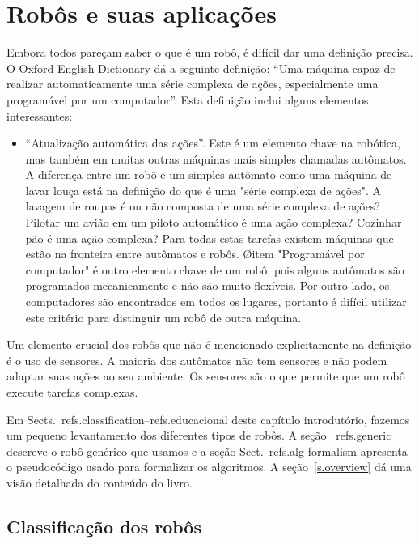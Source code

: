 
\chapter{Robôs e suas aplicações}\label{ch.basic}

Embora todos pareçam saber o que é um robô, é difícil dar uma definição precisa. O Oxford English Dictionary dá a seguinte definição: ``Uma máquina capaz de realizar automaticamente uma série complexa de ações, especialmente uma programável por um computador''. Esta definição inclui alguns elementos interessantes:
\begin{itemize}
\item ``Atualização automática das ações''. Este é um elemento chave na robótica, mas também em muitas outras máquinas mais simples chamadas autômatos. A diferença entre um robô e um simples autômato como uma máquina de lavar louça está na definição do que é uma "série complexa de ações". A lavagem de roupas é ou não composta de uma série complexa de ações? Pilotar um avião em um piloto automático é uma ação complexa? Cozinhar pão é uma ação complexa? Para todas estas tarefas existem máquinas que estão na fronteira entre autômatos e robôs.
\O item "Programável por computador" é outro elemento chave de um robô, pois alguns autômatos são programados mecanicamente e não são muito flexíveis. Por outro lado, os computadores são encontrados em todos os lugares, portanto é difícil utilizar este critério para distinguir um robô de outra máquina.
\end{itemize}
Um elemento crucial dos robôs que não é mencionado explicitamente na definição é o uso de sensores. A maioria dos autômatos não tem sensores e não podem adaptar suas ações ao seu ambiente. Os sensores são o que permite que um robô execute tarefas complexas. 

Em Sects.~ref{s.classification}--ref{s.educacional} deste capítulo introdutório, fazemos um pequeno levantamento dos diferentes tipos de robôs. A seção ~ref{s.generic} descreve o robô genérico que usamos e a seção Sect.~ref{s.alg-formalism} apresenta o pseudocódigo usado para formalizar os algoritmos. A seção~\ref{s.overview} dá uma visão detalhada do conteúdo do livro.

\section{Classificação dos robôs}\label{s.classification}

